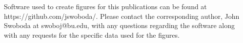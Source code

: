 \documentclass[draft,ras]{agutex}
\begin{document}
\begin{article}
\begin{acknowledgments}
Software used to create figures for this publications can be found at https://github.com/jswoboda/. Please contact the corresponding author, John Swoboda at swoboj@bu.edu, with any questions regarding the software along with any requests for the specific data used for the figures. \end{acknowledgments}




\end{article}
\end{document}
